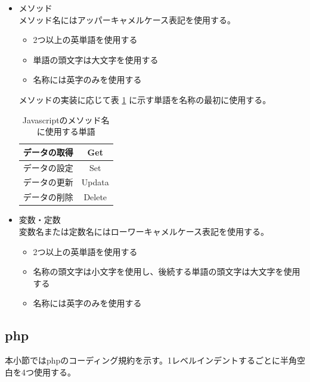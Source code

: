 \documentclass[a4j]{jarticle}
\begin{document}
\begin{itemize}
	\item メソッド\\
		メソッド名にはアッパーキャメルケース表記を使用する。
	\begin{itemize}
		\item 2つ以上の英単語を使用する
		\item 単語の頭文字は大文字を使用する
		\item 名称には英字のみを使用する
	\end{itemize}
		メソッドの実装に応じて表 \ref {tab:o3} に示す単語を名称の最初に使用する。
				\begin{table}[H]
			\caption{Javascriptのメソッド名に使用する単語}
			\label{tab:o3}
			\begin{center}
			\begin{tabular}{|c|c|}
			\hline
			データの取得 & Get\\\hline
			データの設定 & Set\\\hline
			データの更新  & Updata\\\hline
			データの削除  & Delete\\\hline
			\end{tabular}
			\end{center}
			\end{table}
	\item 変数・定数\\
		変数名または定数名にはローワーキャメルケース表記を使用する。
	\begin{itemize}
		\item 2つ以上の英単語を使用する
		\item 名称の頭文字は小文字を使用し、後続する単語の頭文字は大文字を使用する
		\item 名称には英字のみを使用する
	\end{itemize}
\end{itemize}
\subsection{php}

本小節ではphpのコーディング規約を示す。1レベルインデントするごとに半角空白を4つ使用する。
\end{document}
